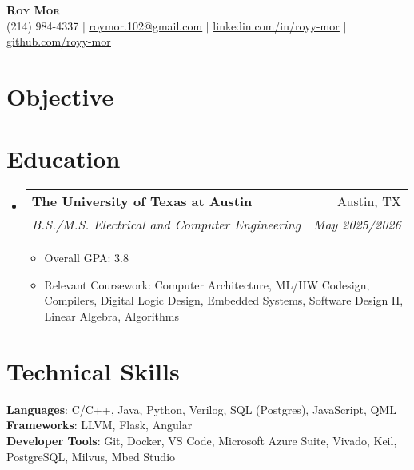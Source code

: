 \documentclass[letterpaper,11pt]{article}
\makeatletter
\newcommand{\resumeItem}[1]{
  \item\small{
    {#1 \vspace{-2pt}}
  }
}
\newcommand{\resumeSubheading}[4]{
  \vspace{-2pt}\item
    \begin{tabular*}{0.97\textwidth}[t]{l@{\extracolsep{\fill}}r}
      \textbf{#1} & #2 \\
      \textit{\small#3} & \textit{\small #4} \\
    \end{tabular*}\vspace{-7pt}
}
\newcommand{\resumeSubHeadingListStart}{\begin{itemize}[leftmargin=0.15in, label={}]}
\newcommand{\resumeSubHeadingListEnd}{\end{itemize}}
\newcommand{\resumeItemListStart}{\begin{itemize}}
\newcommand{\resumeItemListEnd}{\end{itemize}\vspace{-5pt}}
\makeatother
\begin{document}
\begin{center}
  \textbf{\Huge \scshape Roy Mor} \\ \vspace{1pt}
  \small (214) 984-4337 $|$ \href{mailto:x@x.com}{\underline{roymor.102@gmail.com}} $|$ 
  \href{https://linkedin.com/in/royy-mor/}{\underline{linkedin.com/in/royy-mor}} $|$
  \href{https://github.com/royy-mor}{\underline{github.com/royy-mor}}
\end{center}


\section{Objective}
\begin{center}
\end{center}


\section{Education}
  \resumeSubHeadingListStart
    \resumeSubheading
      {The University of Texas at Austin}{Austin, TX}
      {B.S./M.S. Electrical and Computer Engineering}{May 2025/2026}
      \resumeItemListStart
        \resumeItem{Overall GPA: 3.8}
        \resumeItem{Relevant Coursework: Computer Architecture, ML/HW Codesign, Compilers, Digital Logic Design, Embedded Systems, Software Design II, Linear Algebra, Algorithms}
      \resumeItemListEnd

  \resumeSubHeadingListEnd

\section{Technical Skills}
 \begin{itemize}[leftmargin=0.15in, label={}]
    \small{\item{
     \textbf{Languages}{: C/C++, Java, Python, Verilog, SQL (Postgres), JavaScript, QML} \\
     \textbf{Frameworks}{: LLVM, Flask, Angular} \\
     \textbf{Developer Tools}{: Git, Docker, VS Code, Microsoft Azure Suite, Vivado, Keil, PostgreSQL, Milvus, Mbed Studio} \\
    }}
 \end{itemize}
\end{document}
